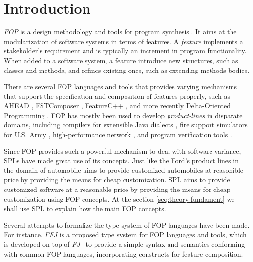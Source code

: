 
\chapter{Introduction}
\textit{\gls{FOP}} \cite{prehofer_feature-oriented_1997} is a design methodology and tools for program synthesis \cite{batory_tutorial_2003}.
It aims at the modularization of software systems in terms of features. A \textit{feature}
implements a stakeholder's requirement and is typically an increment in program functionality.
When added to a software system, a feature introduce new structures, such as classes and methods,
and refines existing ones, such as extending methods bodies.

There are several \gls{FOP} languages and tools that provides varying mechanisms
that support the specification and composition of features properly, such as AHEAD \cite{batory_feature-oriented_2004},
FSTComposer \cite{apel_superimposition:_2008}, FeatureC++ \cite{apel_featurec++:_2005}, and more recently Delta-Oriented Programming \cite{schaefer_delta-oriented_2010}. \gls{FOP} has mostly been used to develop
\textit{product-lines} in disparate domains, including compilers for extensible Java dialects 
\cite{batory_jts:_1998}, fire support simulators for U.S. Army \cite{batory_achieving_2000}, high-performance network
\cite{batory_design_1992}, and program verification tools \cite{kurt_stirewalt_component-based_2001}.

Since \gls{FOP} provides such a powerful mechanism to deal with software variance, \glspl{SPL} have made great use of its concepts.
Just like the Ford's product lines in the domain of automobile aims to provide customized automobiles at reasonible price by providing
the means for cheap customization. \gls{SPL} aims to provide customized software at a reasonable price by providing the means for cheap customization using
\gls{FOP} concepts. At the section \ref{seq:theory fundament} we shall use \gls{SPL} to explain how the main \gls{FOP} concepts.

Several attempts to formalize the type system of \gls{FOP} languages have been made. %
For instance,  \textit{\gls{FFJ}} \cite{apel_feature_2008} is a proposed type system for \gls{FOP} languages and tools, 
which is developed on top of \textit{\gls{FJ}}~\cite{igarashi_featherweight_2001}
to provide a simple syntax and semantics conforming with common \gls{FOP} languages, 
incorporating constructs for feature composition. %


